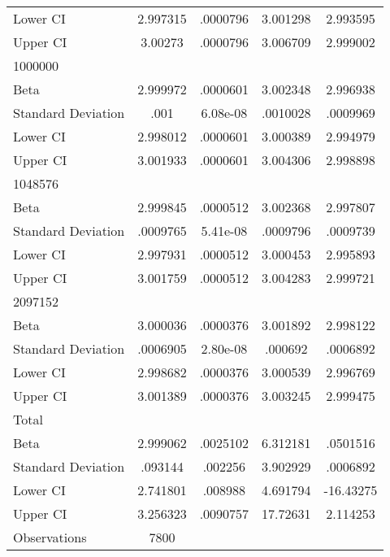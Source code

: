 {\begin{tabular}{l*{1}{cccc}}
Lower CI            &    2.997315&    .0000796&    3.001298&    2.993595\\
Upper CI            &     3.00273&    .0000796&    3.006709&    2.999002\\
\hline
1000000             &            &            &            &            \\
Beta                &    2.999972&    .0000601&    3.002348&    2.996938\\
Standard Deviation  &        .001&    6.08e-08&    .0010028&    .0009969\\
Lower CI            &    2.998012&    .0000601&    3.000389&    2.994979\\
Upper CI            &    3.001933&    .0000601&    3.004306&    2.998898\\
\hline
1048576             &            &            &            &            \\
Beta                &    2.999845&    .0000512&    3.002368&    2.997807\\
Standard Deviation  &    .0009765&    5.41e-08&    .0009796&    .0009739\\
Lower CI            &    2.997931&    .0000512&    3.000453&    2.995893\\
Upper CI            &    3.001759&    .0000512&    3.004283&    2.999721\\
\hline
2097152             &            &            &            &            \\
Beta                &    3.000036&    .0000376&    3.001892&    2.998122\\
Standard Deviation  &    .0006905&    2.80e-08&     .000692&    .0006892\\
Lower CI            &    2.998682&    .0000376&    3.000539&    2.996769\\
Upper CI            &    3.001389&    .0000376&    3.003245&    2.999475\\
\hline
Total               &            &            &            &            \\
Beta                &    2.999062&    .0025102&    6.312181&    .0501516\\
Standard Deviation  &     .093144&     .002256&    3.902929&    .0006892\\
Lower CI            &    2.741801&     .008988&    4.691794&   -16.43275\\
Upper CI            &    3.256323&    .0090757&    17.72631&    2.114253\\
\hline
Observations        &        7800&            &            &            \\
\hline\hline
\end{tabular}
}
